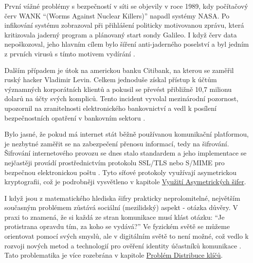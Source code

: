 První vážné problémy s bezpečností v síti se objevily v roce 1989, kdy počítačový červ WANK \enquote{(Worms Against Nuclear Killers)} napadl systémy NASA. Po infikování systému zobrazoval při přihlášení politicky motivovanou zprávu, která kritizovala jaderný program a plánovaný start sondy Galileo. I když červ data nepoškozoval, jeho hlavním cílem bylo šíření anti-jaderného poselství a byl jedním z prvních virusů s tímto motivem vydírání \parencite{erben2014}.

Dalším případem je útok na americkou banku Citibank, na kterou se zaměřil ruský hacker Vladimir Levin. Celkem jednoduše získal přístup k účtům významných korporátních klientů a pokusil se převést přibližně 10,7 milionu dolarů na účty svých kompliců. Tento incident vyvolal mezinárodní pozornost, upozornil na zranitelnosti elektronického bankovnictví a vedl k posílení bezpečnostních opatření v bankovním sektoru \parencite{erben2014}.

Bylo jasné, že pokud má internet stát běžně používanou komunikační platformou, je nezbytné zaměřit se na zabezpečení přenosu informací, tedy na šifrování. Šifrování internetového provozu se dnes stalo standardem a jeho implementace se nejčastěji provádí prostřednictvím protokolu SSL/TLS nebo S/MIME pro bezpečnou elektronickou poštu \parencite{pavlicek2012}. Tyto síťové protokoly využívají asymetrickou kryptografii, což je podrobněji vysvětleno v kapitole \hyperref[sec:asymetricka-kryptografie]{Využití Asymetrických šifer}.

I když jsou z matematického hlediska šifry prakticky neprolomitelné, největším současným problémem zůstává sociální (mezilidský) aspekt - otázka důvěry. V praxi to znamená, že si každá ze stran komunikace musí klást otázku: \enquote{Je protistrana opravdu tím, za koho se vydává?} Ve fyzickém světě se můžeme orientovat pomocí svých smyslů, ale v digitálním světě to není možné, což vedlo k rozvoji nových metod a technologií pro ověření identity účastníků komunikace \parencite{burda2019}. Tato problematika je více rozebrána v kapitole \hyperref[sec:distribuce-klicu]{Problém Distribuce klíčů}.

\newpage